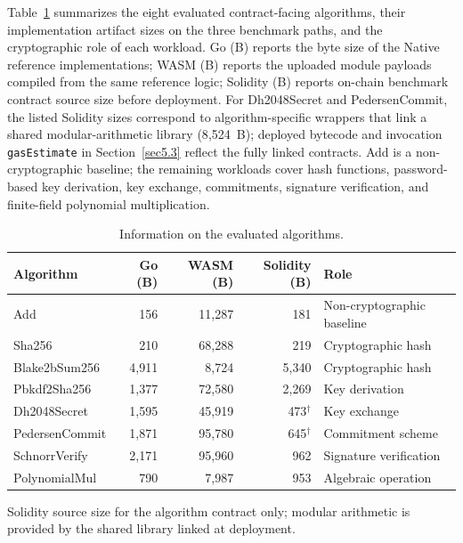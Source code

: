 \documentclass[pdflatex,sn-mathphys-num]{sn-jnl}%
\theoremstyle{thmstyleone}%
\theoremstyle{thmstyletwo}%
\theoremstyle{thmstylethree}%
\begin{document}
Table~\ref{tab:eval-algorithms} summarizes the eight evaluated contract-facing algorithms, their implementation artifact sizes on the three benchmark paths, and the cryptographic role of each workload. Go (B) reports the byte size of the Native reference implementations; WASM (B) reports the uploaded module payloads compiled from the same reference logic; Solidity (B) reports on-chain benchmark contract source size before deployment. For Dh2048Secret and PedersenCommit, the listed Solidity sizes correspond to algorithm-specific wrappers that link a shared modular-arithmetic library (8{,}524~B); deployed bytecode and invocation \texttt{gasEstimate} in Section~\ref{sec5.3} reflect the fully linked contracts. Add is a non-cryptographic baseline; the remaining workloads cover hash functions, password-based key derivation, key exchange, commitments, signature verification, and finite-field polynomial multiplication.

\begin{table}[ht]
\centering
\caption{Information on the evaluated algorithms.\label{tab:eval-algorithms}}
\small
\setlength{\tabcolsep}{4pt}
\begin{tabularx}{\textwidth}{@{}lrrr>{\raggedright\arraybackslash}X@{}}
\toprule
Algorithm & Go (B) & WASM (B) & Solidity (B) & Role \\
\midrule
Add & 156 & 11{,}287 & 181 & Non-cryptographic baseline \\
Sha256 & 210 & 68{,}288 & 219 & Cryptographic hash \\
Blake2bSum256 & 4{,}911 & 8{,}724 & 5{,}340 & Cryptographic hash \\
Pbkdf2Sha256 & 1{,}377 & 72{,}580 & 2{,}269 & Key derivation \\
Dh2048Secret & 1{,}595 & 45{,}919 & 473$^{\dagger}$ & Key exchange \\
PedersenCommit & 1{,}871 & 95{,}780 & 645$^{\dagger}$ & Commitment scheme \\
SchnorrVerify & 2{,}171 & 95{,}960 & 962 & Signature verification \\
PolynomialMul & 790 & 7{,}987 & 953 & Algebraic operation \\
\bottomrule
\end{tabularx}
\begin{tablenotes}
\small
\item[$^{\dagger}$] Solidity source size for the algorithm contract only; modular arithmetic is provided by the shared library linked at deployment.
\end{tablenotes}
\end{table}
\end{document}
